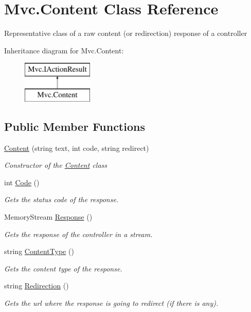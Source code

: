 \hypertarget{class_mvc_1_1_content}{}\section{Mvc.\+Content Class Reference}
\label{class_mvc_1_1_content}


Representative class of a raw content (or redirection) response of a controller  


Inheritance diagram for Mvc.\+Content\+:\begin{figure}[H]
\begin{center}
\leavevmode
\includegraphics[height=2.000000cm]{class_mvc_1_1_content}
\end{center}
\end{figure}
\subsection*{Public Member Functions}
\begin{DoxyCompactItemize}
\item 
\hyperlink{class_mvc_1_1_content_aabb482c66606b1eff2ac79ce3558c175}{Content} (string text, int code, string redirect)
\begin{DoxyCompactList}\small\item\em Constructor of the \hyperlink{class_mvc_1_1_content}{Content} class \end{DoxyCompactList}\item 
int \hyperlink{class_mvc_1_1_content_a77175a25c002834c59e14cde60719c28}{Code} ()
\begin{DoxyCompactList}\small\item\em Gets the status code of the response. \end{DoxyCompactList}\item 
Memory\+Stream \hyperlink{class_mvc_1_1_content_aabe147bc684eed8af000906fbfe92b61}{Response} ()
\begin{DoxyCompactList}\small\item\em Gets the response of the controller in a stream. \end{DoxyCompactList}\item 
string \hyperlink{class_mvc_1_1_content_a5d384ef7d466dfc88ccf1eb7f10728ad}{Content\+Type} ()
\begin{DoxyCompactList}\small\item\em Gets the content type of the response. \end{DoxyCompactList}\item 
string \hyperlink{class_mvc_1_1_content_ae4eba27dbea637dc61bc4b681f731545}{Redirection} ()
\begin{DoxyCompactList}\small\item\em Gets the url where the response is going to redirect (if there is any). \end{DoxyCompactList}\end{DoxyCompactItemize}


